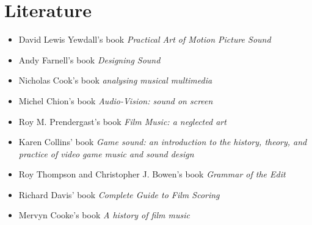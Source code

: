 
\chapter{Literature}
\label{literatures}

\begin{itemize}
\item David Lewis Yewdall's book \textit{Practical Art of Motion Picture Sound} \citep{yewdall2003practical} 

\item Andy Farnell's book \textit{Designing Sound} \citep{farnell2010designing}

 
\item Nicholas Cook's book \textit{analysing musical multimedia} \citep{cook1998analysing} 


\item Michel Chion's book \textit{Audio-Vision: sound on screen} \citep{chion1990} 


\item Roy M. Prendergast's book \textit{Film Music: a neglected art} \citep{prendergast1992film} 

\item Karen Collins' book \textit{Game sound: an introduction to the history, theory, and practice of video game music and sound design} \citep{collins2008game}


\item Roy Thompson and Christopher J. Bowen's book \textit{Grammar of the Edit} \citep{thompson2009grammar} 

\item Richard Davis' book \textit{Complete Guide to Film Scoring} \citep{davis2010complete}

\item Mervyn Cooke's book \textit{A history of film music} \citep{cooke2008history}

\end{itemize}
